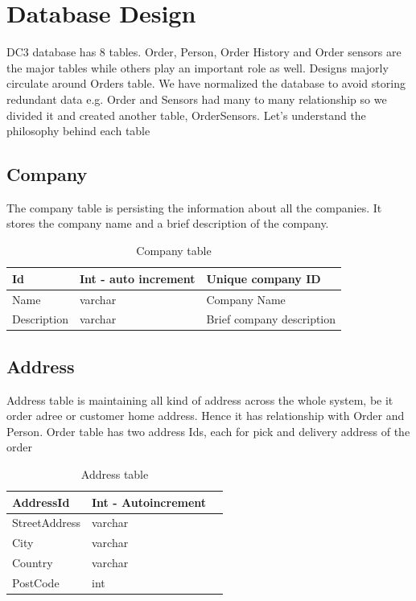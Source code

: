 \section{Database Design}
DC3 database has 8 tables. Order, Person, Order History and Order sensors are the major tables while others play an important role as well.  Designs majorly circulate around Orders table. We have normalized the database to avoid storing redundant data e.g. Order and Sensors had many to many relationship so we divided it and created another table, OrderSensors. Let’s understand the philosophy behind each table


\subsection{Company}
The company table is persisting the information about all the companies. It stores the company name and a brief description of the company. 

\begin{table}[!ht]
	\centering
	\begin{tabular}{ |l|l|l| }
		\hline
		Id & Int - auto increment & Unique company ID \\
		\hline
		Name & varchar & Company Name \\
		\hline
		Description & varchar & Brief company description \\
		\hline
	\end{tabular}
	\caption{Company table}
\end{table}



\subsection{Address}
Address table is maintaining all kind of address across the whole system, be it order adree or customer home address. Hence it has relationship with Order and Person. Order table has two address Ids, each for pick and delivery address of the order



\begin{table}[!ht]
	\centering
	\begin{tabular}{ |l|l|l| }
		\hline
		AddressId  & Int - Autoincrement & \\
		\hline
		StreetAddress  & varchar & \\
		\hline
		City  & varchar &\\
		\hline
		Country  & varchar &\\
		\hline
		PostCode  & int &\\
		\hline
	\end{tabular}
	\caption{Address table}
\end{table}




